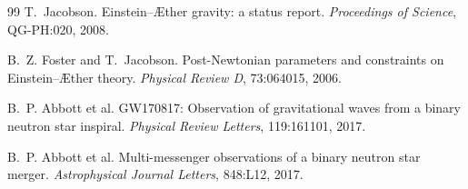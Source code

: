 \documentclass[12pt,a4paper]{article}
\newcommand{\AEther}{\AE{}ther}
\begin{document}
\begin{thebibliography}{99}
        T.~Jacobson.
        \newblock Einstein--\AEther{} gravity: a status report.
        \newblock \emph{Proceedings of Science}, QG-PH:020, 2008.
        \newblock {}
        
        B.~Z. Foster and T.~Jacobson.
        \newblock Post-Newtonian parameters and constraints on Einstein--\AEther{} theory.
        \newblock \emph{Physical Review D}, 73:064015, 2006.
        \newblock {}
        
        B.~P. Abbott et al.
        \newblock GW170817: Observation of gravitational waves from a binary neutron star inspiral.
        \newblock \emph{Physical Review Letters}, 119:161101, 2017.
        \newblock {}
        
        B.~P. Abbott et al.
        \newblock Multi-messenger observations of a binary neutron star merger.
        \newblock \emph{Astrophysical Journal Letters}, 848:L12, 2017.
        \newblock {}

\end{thebibliography}
\end{document}

